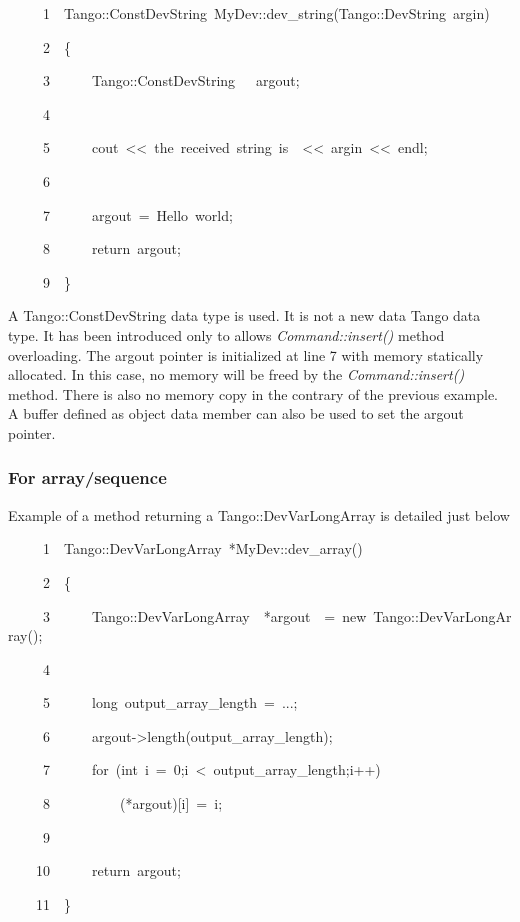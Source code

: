 
\begin{lyxcode}
~~~~~1~~Tango::ConstDevString~MyDev::dev\_string(Tango::DevString~argin)

~~~~~2~~\{

~~~~~3~~~~~~Tango::ConstDevString~~~argout;

~~~~~4~~

~~~~~5~~~~~~cout~<\textcompwordmark{}<~\textquotedbl{}the~received~string~is~\textquotedbl{}~<\textcompwordmark{}<~argin~<\textcompwordmark{}<~endl;

~~~~~6~~~~~~~~~~

~~~~~7~~~~~~argout~=~\textquotedbl{}Hello~world\textquotedbl{};~

~~~~~8~~~~~~return~argout;

~~~~~9~~\}
\end{lyxcode}


A Tango::ConstDevString data type is
used. It is not a new data Tango data type. It has been introduced
only to allows \emph{Command::insert()} method overloading. The argout
pointer is initialized at line 7 with memory statically allocated.
In this case, no memory will be freed by the \emph{Command::insert()}
method. There is also no memory copy in the contrary
of the previous example. A buffer defined as object data member can
also be used to set the argout pointer.


\subsubsection{For array/sequence}

Example of a method returning a Tango::DevVarLongArray
is detailed just below


\begin{lyxcode}
~~~~~1~~Tango::DevVarLongArray~{*}MyDev::dev\_array()

~~~~~2~~\{

~~~~~3~~~~~~Tango::DevVarLongArray~~{*}argout~~=~new~Tango::DevVarLongArray();

~~~~~4~~~~~~~~~~~~~~~~~~

~~~~~5~~~~~~long~output\_array\_length~=~...;

~~~~~6~~~~~~argout->length(output\_array\_length);

~~~~~7~~~~~~for~(int~i~=~0;i~<~output\_array\_length;i++)

~~~~~8~~~~~~~~~~({*}argout){[}i{]}~=~i;

~~~~~9~~

~~~~10~~~~~~return~argout;

~~~~11~~\}
\end{lyxcode}


